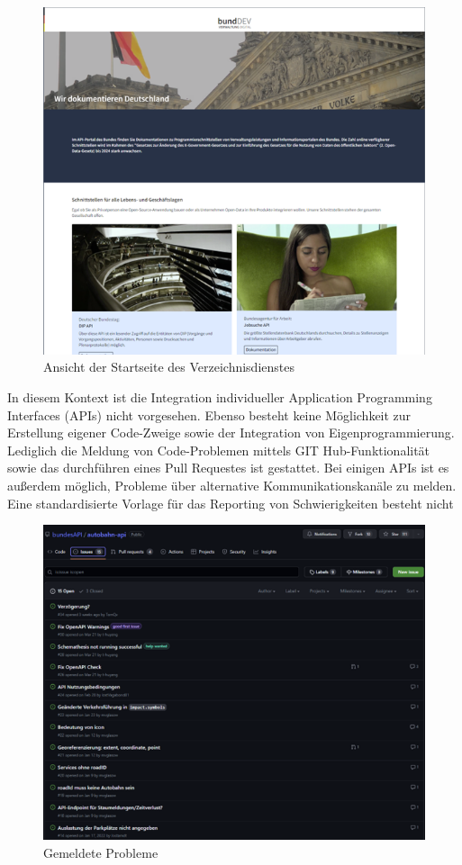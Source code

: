 \documentclass[notitlepage, hidelinks]{article}
\begin{document}
\begin{figure}[H]
\centering
  \includegraphics[width=\textwidth]{images/bundwebsite.png}
  \caption{Ansicht der Startseite des Verzeichnisdienstes}
  \label{fig:}
\end{figure}

In diesem Kontext ist die Integration individueller Application Programming Interfaces (APIs) nicht vorgesehen. Ebenso besteht keine Möglichkeit zur Erstellung eigener Code-Zweige sowie der Integration von Eigenprogrammierung. Lediglich die Meldung von Code-Problemen mittels GIT Hub-Funktionalität sowie das durchführen eines Pull Requestes ist gestattet. Bei einigen APIs ist es außerdem möglich, Probleme über alternative Kommunikationskanäle zu melden. Eine standardisierte Vorlage für das Reporting von Schwierigkeiten besteht nicht

\begin{figure}[H]
\centering
  \includegraphics[width=\textwidth]{images/gitissues.png}
  \caption{Gemeldete Probleme}
  \label{fig:}
\end{figure}
\end{document}
